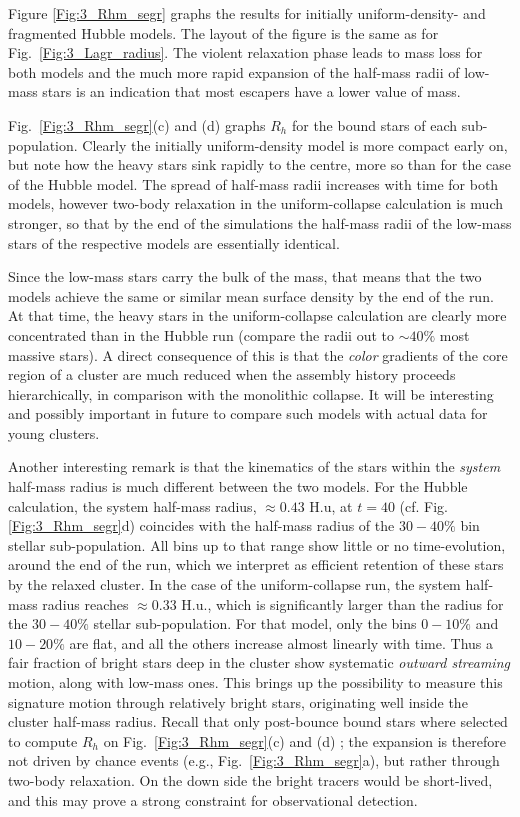 Figure \ref{Fig:3_Rhm_segr} graphs the results for initially uniform-density- and fragmented Hubble models. The layout of the figure is the same as for Fig.~\ref{Fig:3_Lagr_radius}. The violent relaxation phase leads to mass loss for both models and the much more rapid expansion of the half-mass radii of low-mass stars is an indication that most escapers have a lower value of mass.

 Fig.~\ref{Fig:3_Rhm_segr}(c) and (d) graphs $R_h$ for the bound stars of each sub-population. Clearly the initially uniform-density model is more compact early on, but note how the heavy stars sink rapidly to the centre, more so than for the case of the Hubble model. The spread of half-mass radii increases with time for both models, however two-body relaxation in the uniform-collapse calculation is much stronger, so that by the end of the simulations the half-mass radii of the low-mass stars of the respective models are essentially identical. 
 
 Since the low-mass stars carry the bulk of the mass, that means that the two models achieve the same or similar mean surface density by the end of the run. At that time, the heavy stars in the uniform-collapse calculation are clearly more concentrated than in the Hubble run (compare the radii out to $\sim 40\%$ most massive stars). A direct consequence of this is that the {\it color} gradients of the core region of a cluster are much reduced when the assembly history proceeds hierarchically, in comparison with the monolithic collapse. It will be interesting and possibly important in future to compare such models with actual data for young clusters.

Another interesting remark is that the kinematics of the stars within the {\it system} half-mass radius is much different between the two models. For the Hubble calculation, the system half-mass radius, $ \approx 0.43 $ H.u, at $t = 40$ (cf. Fig.\ref{Fig:3_Rhm_segr}d) coincides with the half-mass radius of the $30-40\%$ bin stellar sub-population. All bins up to that range show little or no time-evolution, around the end of the run, which we interpret as efficient retention of these stars by the relaxed cluster. In the case of the uniform-collapse run, the system half-mass radius reaches $\approx 0.33$ H.u., which is significantly larger than the radius for the $30-40\%$ stellar sub-population. For that model, only the bins $0-10\%$ and $10-20\%$ are flat, and all the others increase almost linearly with time. Thus a fair fraction of bright stars deep in the cluster show systematic {\it outward streaming} motion, along with low-mass ones. This brings up the possibility to measure this signature motion through relatively bright stars, originating well inside the cluster half-mass radius. Recall that only post-bounce bound stars where selected to compute $R_h$ on Fig.~\ref{Fig:3_Rhm_segr}(c) and (d) ; the expansion is therefore not driven by chance events (e.g., Fig.~\ref{Fig:3_Rhm_segr}a), but rather through two-body relaxation. On the down side the bright tracers would be short-lived, and this may prove a strong constraint for observational detection.


